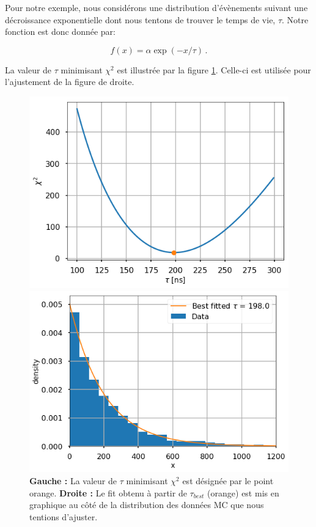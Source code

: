 Pour notre exemple, nous considérons une distribution d'évènements suivant une décroissance exponentielle dont nous tentons de trouver le temps de vie, $\tau$. Notre fonction est donc donnée par:

\begin{equation}
f(x) = \alpha \exp(-x / \tau) \, .
\end{equation}

La valeur de $\tau$ minimisant $\chi^2$ est illustrée par la figure \ref{fig:chi2}. Celle-ci est utilisée pour l'ajustement de la figure de droite.

\begin{figure}[h!]
    \centering
    \begin{minipage}[b]{0.48\linewidth}
    \includegraphics[width=\linewidth]{figures/chi_2.png}
    \end{minipage}
    \hfill
    \begin{minipage}[b]{0.51\linewidth}
    \includegraphics[width=\linewidth]{figures/chi_2_bestfit.png}
    \end{minipage}
    \caption{\textbf{Gauche :} La valeur de $\tau$ minimisant $\chi^2$ est désignée par le point orange. \textbf{Droite :} Le fit obtenu à partir de $\tau_{best}$ (orange) est mis en graphique au côté de la distribution des données MC que nous tentions d'ajuster.}
    \label{fig:chi2}
\end{figure}

